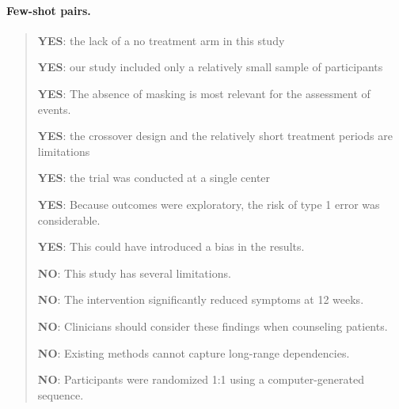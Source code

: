 \paragraph{Few-shot pairs.}
\begin{quote}\small
\noindent\textbf{YES}: the lack of a no treatment arm in this study\par
\noindent\textbf{YES}: our study included only a relatively small sample of participants\par
\noindent\textbf{YES}: The absence of masking is most relevant for the assessment of events.\par
\noindent\textbf{YES}: the crossover design and the relatively short treatment periods are limitations\par
\noindent\textbf{YES}: the trial was conducted at a single center\par
\noindent\textbf{YES}: Because outcomes were exploratory, the risk of type 1 error was considerable.\par
\noindent\textbf{YES}: This could have introduced a bias in the results.\par
\noindent\textbf{NO}: This study has several limitations.\par
\noindent\textbf{NO}: The intervention significantly reduced symptoms at 12 weeks.\par
\noindent\textbf{NO}: Clinicians should consider these findings when counseling patients.\par
\noindent\textbf{NO}: Existing methods cannot capture long-range dependencies.\par
\noindent\textbf{NO}: Participants were randomized 1:1 using a computer-generated sequence.\par
\end{quote}
